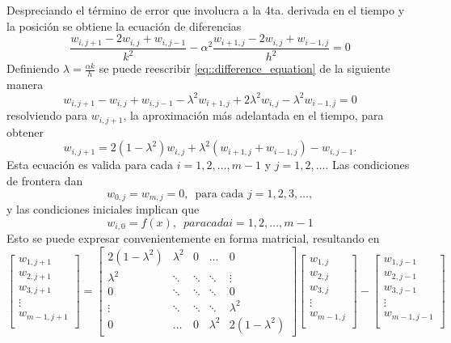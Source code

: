 \documentclass[a4paper]{article}
\begin{document}
Despreciando el término de error que involucra a la 4ta. derivada en el tiempo y la posición se obtiene la ecuación de diferencias
\begin{equation}\label{eq::difference_equation}
\frac{w_{i,j+1}-2w_{i,j}+w_{i,j-1}}{k^2}-\alpha^2\frac{w_{i+1,j}-2w_{i,j}+w_{i-1,j}}{h^2}=0
\end{equation}
Definiendo $\lambda=\frac{\alpha k}{h}$ se puede reescribir \ref{eq::difference_equation} de la siguiente manera
\begin{equation}
w_{i,j+1}-w_{i,j}+w_{i,j-1}-\lambda^2 w_{i+1,j}+2\lambda^2 w_{i,j}-\lambda^2 w_{i-1,j}=0
\end{equation}
resolviendo para $w_{i,j+1}$, la aproximación más adelantada en el tiempo, para obtener
\begin{equation}
w_{i,j+1}=2(1-\lambda^2)w_{i,j}+\lambda^2(w_{i+1,j}+w_{i-1,j})-w_{i,j-1}.
\end{equation}
Esta ecuación es valida para cada $i=1,2,\hdots,m-1$ y $j=1,2,\hdots$. Las condiciones de frontera dan
\begin{equation}
w_{0,j}=w_{m,j}=0,\,\,\,\text{para cada }j=1,2,3,\hdots,
\end{equation}
y las condiciones iniciales implican que
\begin{equation}
w_{i,0}=f(x), \,\,\, para cada i=1,2,\hdots,m-1
\end{equation}
Esto se puede expresar convenientemente en forma matricial, resultando en 
\begin{equation}\label{eq::matrix_difference_equation}
\begin{bmatrix}
w_{1,j+1}\\
w_{2,j+1}\\
w_{3,j+1}\\
\vdots\\
w_{m-1,j+1}\\
\end{bmatrix}
=
\begin{bmatrix}
2(1-\lambda^2) & \lambda^2 & 0 &\dots&0 \\
\lambda^2     &\ddots    & \ddots& \ddots&\vdots\\
0&\ddots&\ddots&\ddots&0\\
\vdots&\ddots&\ddots&\ddots&\lambda^2 \\
0&\dots&0&\lambda^2 &2(1-\lambda^2)
\end{bmatrix}
\begin{bmatrix}
w_{1,j}\\
w_{2,j}\\
w_{3,j}\\
\vdots\\
w_{m-1,j}\\
\end{bmatrix}-
\begin{bmatrix}
w_{1,j-1}\\
w_{2,j-1}\\
w_{3,j-1}\\
\vdots\\
w_{m-1,j-1}\\
\end{bmatrix}
\end{equation}
\end{document}
